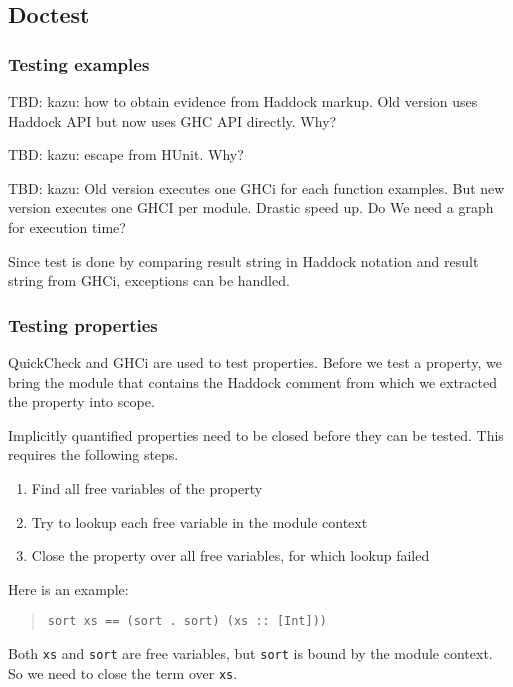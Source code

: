 \documentclass[preprint]{sigplanconf}
\begin{document}
\subsection{Doctest}
\label{sec:doctest}

\subsubsection{Testing examples}

TBD: kazu: how to obtain evidence from Haddock markup.
Old version uses Haddock API but now uses GHC API directly. Why?

TBD: kazu: escape from HUnit. Why?

TBD: kazu: Old version executes one GHCi for each function examples.
But new version executes one GHCI per module.
Drastic speed up. Do We need a graph for execution time?

Since test is done by comparing result string in Haddock notation
and result string from GHCi, exceptions can be handled.

\subsubsection{Testing properties}

\noindent QuickCheck and GHCi are used to test properties.  Before we
test a property, we bring the module that contains the Haddock comment
from which we extracted the property into scope.

Implicitly quantified properties need to be closed before they can be
tested.  This requires the following steps.
\begin{enumerate}
    \item
        Find all free variables of the property
    \item
        Try to lookup each free variable in the module context
    \item
        Close the property over all free variables, for which lookup
        failed
\end{enumerate}

\noindent Here is an example:

\begin{quote}\small\begin{verbatim}
sort xs == (sort . sort) (xs :: [Int]))
\end{verbatim}\end{quote}

\noindent Both \verb|xs| and \verb|sort| are free variables, but
\verb|sort| is bound by the module context.  So we need to close the
term over \verb|xs|.
\end{document}
